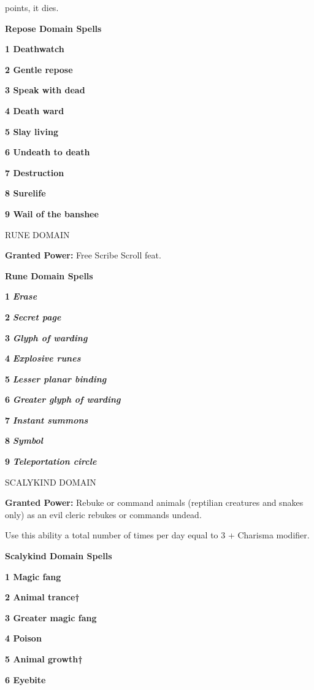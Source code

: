 \documentclass{article}
\begin{document}
points, it dies.

\textbf{Repose Domain Spells}

\textbf{1 Deathwatch}

\textbf{2 Gentle repose}

\textbf{3 Speak with dead}

\textbf{4 Death ward}

\textbf{5 Slay living}

\textbf{6 Undeath to death}

\textbf{7 Destruction}

\textbf{8 Surelife}

\textbf{9 Wail of the banshee}

\vspace{12pt}
RUNE DOMAIN

\textbf{Granted Power:} Free Scribe Scroll feat.

\textbf{Rune Domain Spells}

\textbf{1 }\textit{\textbf{Erase}}

\textbf{2 }\textit{\textbf{Secret page}}

\textbf{3 }\textit{\textbf{Glyph of warding}}

\textbf{4 }\textit{\textbf{Explosive runes}}

\textbf{5 }\textit{\textbf{Lesser planar binding}}

\textbf{6 }\textit{\textbf{Greater glyph of warding}}

\textbf{7 }\textit{\textbf{Instant summons}}

\textbf{8 }\textit{\textbf{Symbol}}

\textbf{9 }\textit{\textbf{Teleportation circle}}

\vspace{12pt}
SCALYKIND DOMAIN

\textbf{Granted Power:} Rebuke or command animals (reptilian creatures and snakes 
only) as an evil cleric rebukes or commands undead.

Use this ability a total number of times per day equal to 3 + Charisma modifier.

\textbf{Scalykind Domain Spells}

\textbf{1 Magic fang}

\textbf{2 Animal trance†}

\textbf{3 Greater magic fang}

\textbf{4 Poison}

\textbf{5 Animal growth†}

\textbf{6 Eyebite}
\end{document}
